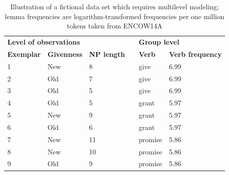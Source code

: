 \documentclass[a4paper,12pt]{article}
\begin{document}
\begin{table}
  \centering
  \begin{tabular}{lllp{0.5cm}ll}
    \toprule
    \multicolumn{3}{l}{\textbf{Level of observations}}    && \multicolumn{2}{l}{\textbf{Group level}} \\
    \textbf{Exemplar} & \textbf{Givenness} & \textbf{NP length} && \textbf{Verb} & \textbf{Verb frequency} \\
    \midrule
            1 &     New   &      8    &&    give   &   6.99    \\
            2 &     Old   &      7    &&    give   &   6.99    \\
            3 &     Old   &      5    &&    give   &   6.99    \\
            4 &     Old   &      5    &&    grant  &   5.97    \\
            5 &     New   &      9    &&    grant  &   5.97    \\
            6 &     Old   &      6    &&    grant  &   5.97    \\
            7 &     New   &      11   &&   promise &   5.86    \\
            8 &     New   &      10   &&   promise &   5.86    \\
            9 &     Old   &      9    &&   promise &   5.86    \\
    \bottomrule
  \end{tabular}
  \caption{Illustration of a fictional data set which requires multilevel modeling; lemma frequencies are logarithm-transformed frequencies per one million tokens taken from ENCOW14A}
  \label{tab:multilevel}
\end{table}
\end{document}
